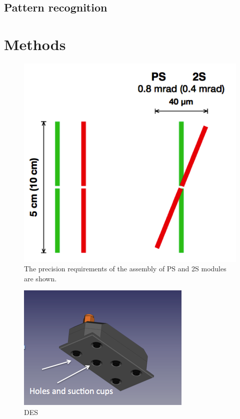 \documentclass[fleqn,10pt]{SelfArx} %
\begin{document}
\subsection{Pattern recognition}




\section{Methods}

\begin{figure}[ht]\centering %
\includegraphics[width=0.5\linewidth]{Precision.png}
\caption{The precision requirements of the assembly of PS and 2S modules are shown.}
\label{fig:precision}
\end{figure}


\begin{figure}[ht]\centering %
\includegraphics[width=\linewidth]{pickuptool.png}
\caption{DES}
\label{fig:pickuptool}
\end{figure}
\end{document}
